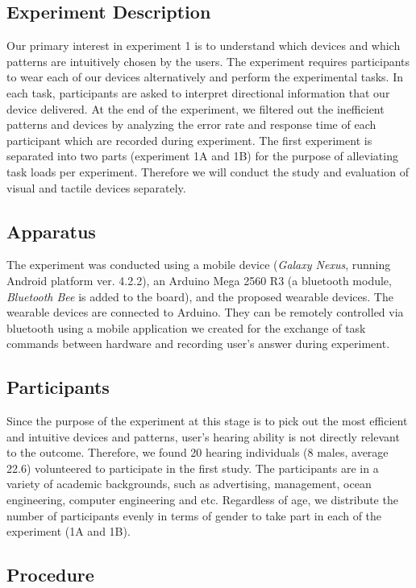 \documentclass{sigchi}
\begin{document}
\subsection{Experiment Description}
Our primary interest in experiment 1 is to understand which devices and which patterns are intuitively chosen by the users. The experiment requires participants to wear each of our devices alternatively and perform the experimental tasks. In each task, participants are asked to interpret directional information that our device delivered. At the end of the experiment, we filtered out the inefficient patterns and devices by analyzing the error rate and response time of each participant which are recorded during experiment. The first experiment is separated into two parts (experiment 1A and 1B) for the purpose of alleviating task loads per experiment. Therefore we will conduct the study and evaluation of visual and tactile devices separately.

\subsection{Apparatus}
The experiment was conducted using a mobile device (\textit{Galaxy Nexus}, running Android platform ver. 4.2.2), an Arduino Mega 2560 R3 (a bluetooth module, \textit{Bluetooth Bee} is added to the board), and the proposed wearable devices. The wearable devices are connected to Arduino. They can be remotely controlled via bluetooth using a mobile application we created for the exchange of task commands between hardware and recording user's answer during experiment.

\subsection{Participants}
Since the purpose of the experiment at this stage is to pick out the most efficient and intuitive devices and patterns, user’s hearing ability is not directly relevant to the outcome. Therefore, we found 20 hearing individuals (8 males, average 22.6) volunteered to participate in the first study. The participants are in a variety of academic backgrounds, such as advertising, management, ocean engineering, computer engineering and etc. Regardless of age, we distribute the number of participants evenly in terms of gender to take part in each of the experiment (1A and 1B).

\subsection{Procedure}
\end{document}
